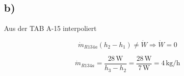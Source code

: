 

\subsection*{b)}

Aus der TAB A-15 interpoliert

\[
\dot{m}_{R134a} (h_2 - h_1) \neq \dot{W} \Rightarrow \dot{W} = 0
\]

\[
\dot{m}_{R134a} = \frac{28 \, \text{W}}{h_3 - h_2} = \frac{28 \, \text{W}}{7 \, \text{W}} = 4 \, \text{kg/h}
\]